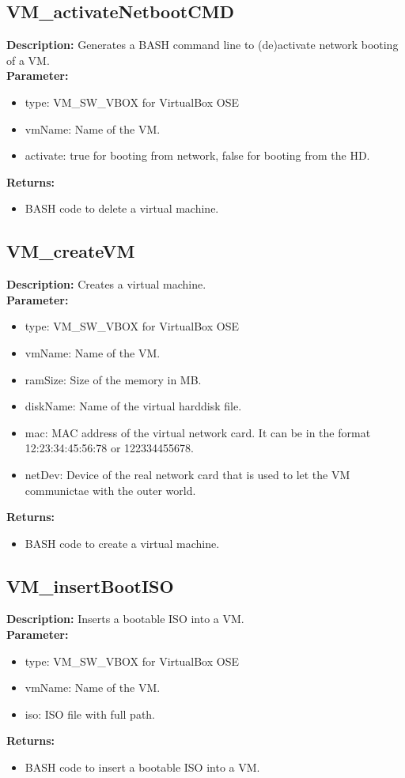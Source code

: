 \subsection{VM\_activateNetbootCMD}
\textbf{Description:} Generates a BASH command line to (de)activate network booting of a VM.\\
\textbf{Parameter:}
\begin{itemize}
\item type: VM\_SW\_VBOX for VirtualBox OSE
\item vmName: Name of the VM.
\item activate: true for booting from network, false for booting from the HD.
\end{itemize}
\textbf{Returns:}
\begin{itemize}
\item BASH code to delete a virtual machine.
\end{itemize}

\subsection{VM\_createVM}
\textbf{Description:} Creates a virtual machine.\\
\textbf{Parameter:}
\begin{itemize}
\item type: VM\_SW\_VBOX for VirtualBox OSE
\item vmName: Name of the VM.
\item ramSize: Size of the memory in MB.
\item diskName: Name of the virtual harddisk file.
\item mac: MAC address of the virtual network card. It can be in the format 12:23:34:45:56:78 or 122334455678.
\item netDev: Device of the real network card that is used to let the VM communictae with the outer world.
\end{itemize}
\textbf{Returns:}
\begin{itemize}
\item BASH code to create a virtual machine.
\end{itemize}

\subsection{VM\_insertBootISO}
\textbf{Description:} Inserts a bootable ISO into a VM.\\
\textbf{Parameter:}
\begin{itemize}
\item type: VM\_SW\_VBOX for VirtualBox OSE
\item vmName: Name of the VM.
\item iso: ISO file with full path.
\end{itemize}
\textbf{Returns:}
\begin{itemize}
\item BASH code to insert a bootable ISO into a VM.
\end{itemize}

